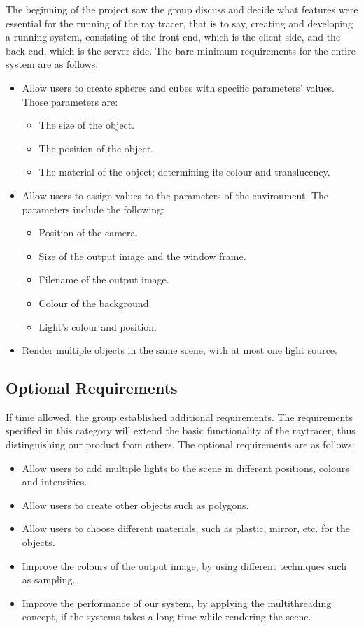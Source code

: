 \documentclass[a4paper]{article}
\begin{document}
	
	The beginning of the project saw the group discuss and decide what features were essential for the running of the ray tracer, that is to say, creating and developing a running system, consisting of the front-end, which is the client side, and the back-end, which is the server side. The bare minimum requirements for the entire system are as follows:
	\begin{itemize}
		\item Allow users to create spheres and cubes with specific parameters' values. Those parameters are:
		\begin{itemize}
			\item The size of the object.
			\item The position of the object.
			\item The material of the object; determining its colour and translucency.
		\end{itemize}
		\item Allow users to assign values to the parameters of the environment. The parameters include the following:
		\begin{itemize}
			\item Position of the camera.
			\item Size of the output image and the window frame.
			\item Filename of the output image.
			\item Colour of the background.
			\item Light's colour and position.
		\end{itemize}
		\item Render multiple objects in the same scene, with at most one light source.
	\end{itemize}
	
	
	\subsection{Optional Requirements}
	
	If time allowed, the group established additional requirements.
	The requirements specified in this category will extend the basic functionality of the raytracer, thus distinguishing our product from others. The optional requirements are as follows:
	\begin{itemize}
		\item Allow users to add multiple lights to the scene in different positions, colours and intensities.
		\item Allow users to create other objects such as polygons.
		\item Allow users to choose different materials, such as plastic, mirror, etc. for the objects.
		\item Improve the colours of the output image, by using different techniques such as sampling.
		\item Improve the performance of our system, by applying the multithreading concept, if the systems takes a long time while rendering the scene.
	\end{itemize}
	
\end{document}
